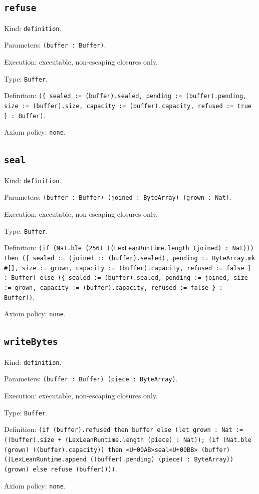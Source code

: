 \documentclass[11pt]{article}
\begin{document}
\subsection*{\texttt{refuse}}
\noindent Kind: \texttt{definition}.\par
\noindent Parameters: \texttt{(buffer : Buffer)}.\par
\noindent Execution: executable, non-escaping closures only.\par
\noindent Type: \texttt{Buffer}.\par
\noindent Definition: \texttt{(\{ sealed := (buffer).sealed, pending := (buffer).pending, size := (buffer).size, capacity := (buffer).capacity, refused := true \} : Buffer)}.\par
\noindent Axiom policy: \texttt{none}.\par
\subsection*{\texttt{seal}}
\noindent Kind: \texttt{definition}.\par
\noindent Parameters: \texttt{(buffer : Buffer) (joined : ByteArray) (grown : Nat)}.\par
\noindent Execution: executable, non-escaping closures only.\par
\noindent Type: \texttt{Buffer}.\par
\noindent Definition: \texttt{(if (Nat.ble (256) ((LexLeanRuntime.length (joined) : Nat))) then (\{ sealed := (joined :: (buffer).sealed), pending := ByteArray.mk \#[], size := grown, capacity := (buffer).capacity, refused := false \} : Buffer) else (\{ sealed := (buffer).sealed, pending := joined, size := grown, capacity := (buffer).capacity, refused := false \} : Buffer))}.\par
\noindent Axiom policy: \texttt{none}.\par
\subsection*{\texttt{writeBytes}}
\noindent Kind: \texttt{definition}.\par
\noindent Parameters: \texttt{(buffer : Buffer) (piece : ByteArray)}.\par
\noindent Execution: executable, non-escaping closures only.\par
\noindent Type: \texttt{Buffer}.\par
\noindent Definition: \texttt{(if (buffer).refused then buffer else (let grown : Nat := ((buffer).size + (LexLeanRuntime.length (piece) : Nat)); (if (Nat.ble (grown) ((buffer).capacity)) then <U+00AB>seal<U+00BB> (buffer) ((LexLeanRuntime.append ((buffer).pending) (piece) : ByteArray)) (grown) else refuse (buffer))))}.\par
\noindent Axiom policy: \texttt{none}.\par
\end{document}
